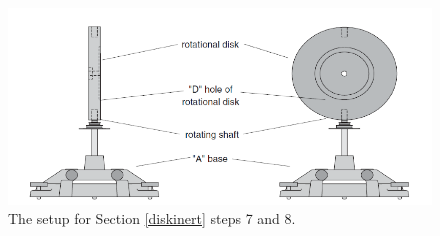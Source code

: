 \begin{figure}[!h]
	\begin{center}
		\includegraphics[width=0.8\linewidth]{./Exp6/pic/crazyfig.png}
	\end{center}
	\caption{The setup for Section \ref{diskinert} steps 7 and 8.}
	\label{fig:rotinertias}
\end{figure}

